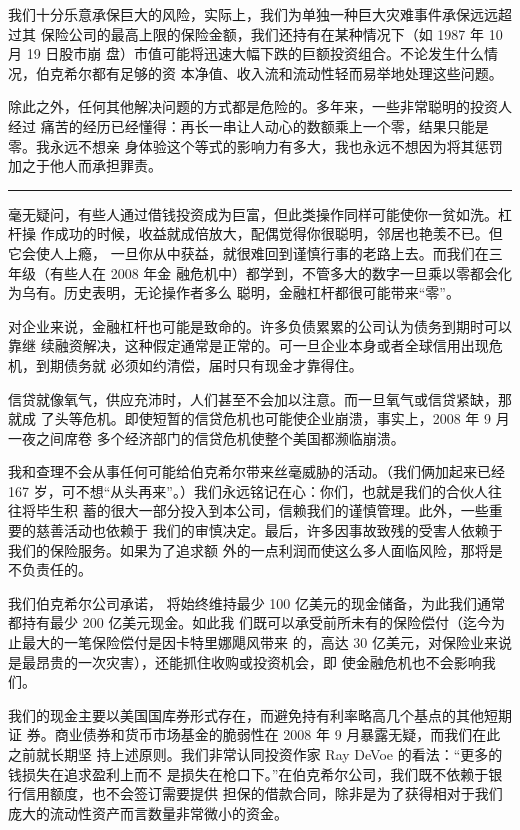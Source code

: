 \documentclass[UTF8,a4paper,zihao=-4,fontset = windows]{ctexart} %
\begin{document}
我们十分乐意承保巨大的风险，实际上，我们为单独一种巨大灾难事件承保远远超过其
保险公司的最高上限的保险金额，我们还持有在某种情况下（如 1987 年 10 月 19 日股市崩
盘）市值可能将迅速大幅下跌的巨额投资组合。不论发生什么情况，伯克希尔都有足够的资
本净值、收入流和流动性轻而易举地处理这些问题。

除此之外，任何其他解决问题的方式都是危险的。多年来，一些非常聪明的投资人经过
痛苦的经历已经懂得：再长一串让人动心的数额乘上一个零，结果只能是零。我永远不想亲
身体验这个等式的影响力有多大，我也永远不想因为将其惩罚加之于他人而承担罪责。

\rule{10cm}{0.4pt}

毫无疑问，有些人通过借钱投资成为巨富，但此类操作同样可能使你一贫如洗。杠杆操
作成功的时候，收益就成倍放大，配偶觉得你很聪明，邻居也艳羡不已。但它会使人上瘾，
一旦你从中获益，就很难回到谨慎行事的老路上去。而我们在三年级（有些人在 2008 年金
融危机中）都学到，不管多大的数字一旦乘以零都会化为乌有。历史表明，无论操作者多么
聪明，金融杠杆都很可能带来“零”。

对企业来说，金融杠杆也可能是致命的。许多负债累累的公司认为债务到期时可以靠继
续融资解决，这种假定通常是正常的。可一旦企业本身或者全球信用出现危机，到期债务就
必须如约清偿，届时只有现金才靠得住。

信贷就像氧气，供应充沛时，人们甚至不会加以注意。而一旦氧气或信贷紧缺，那就成
了头等危机。即使短暂的信贷危机也可能使企业崩溃，事实上，2008 年 9 月一夜之间席卷
多个经济部门的信贷危机使整个美国都濒临崩溃。

我和查理不会从事任何可能给伯克希尔带来丝毫威胁的活动。（我们俩加起来已经 167
岁，可不想“从头再来”。）我们永远铭记在心：你们，也就是我们的合伙人往往将毕生积
蓄的很大一部分投入到本公司，信赖我们的谨慎管理。此外，一些重要的慈善活动也依赖于
我们的审慎决定。最后，许多因事故致残的受害人依赖于我们的保险服务。如果为了追求额
外的一点利润而使这么多人面临风险，那将是不负责任的。

我们伯克希尔公司承诺，
将始终维持最少 100 亿美元的现金储备，为此我们通常都持有最少 200 亿美元现金。如此我
们既可以承受前所未有的保险偿付（迄今为止最大的一笔保险偿付是因卡特里娜飓风带来
的，高达 30 亿美元，对保险业来说是最昂贵的一次灾害），还能抓住收购或投资机会，即
使金融危机也不会影响我们。

我们的现金主要以美国国库券形式存在，而避免持有利率略高几个基点的其他短期证
券。商业债券和货币市场基金的脆弱性在 2008 年 9 月暴露无疑，而我们在此之前就长期坚
持上述原则。我们非常认同投资作家 Ray DeVoe 的看法：“更多的钱损失在追求盈利上而不
是损失在枪口下。”在伯克希尔公司，我们既不依赖于银行信用额度，也不会签订需要提供
担保的借款合同，除非是为了获得相对于我们庞大的流动性资产而言数量非常微小的资金。
\end{document}
